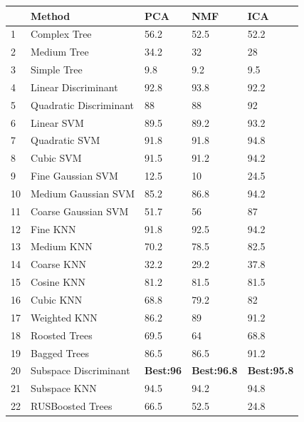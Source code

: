 \begin{center}
\begin{tabular}{|l|l|l|l|l|}
\hline
&Method&PCA&NMF&ICA\\\hline
1&Complex Tree &56.2&52.5&52.2\\\hline
2&Medium Tree & 34.2&32&28\\\hline
3&Simple Tree & 9.8&9.2&9.5\\\hline
4&Linear Discriminant & 92.8&93.8&92.2\\\hline
5&Quadratic Discriminant & 88&88&92\\\hline
6&Linear SVM& 89.5&89.2&93.2\\\hline
7&Quadratic SVM&91.8&91.8&94.8\\\hline
8&Cubic SVM& 91.5&91.2&94.2\\\hline
9&Fine Gaussian SVM&12.5&10&24.5\\\hline
10&Medium Gaussian SVM&85.2&86.8&94.2\\\hline
11&Coarse Gaussian SVM&51.7&56&87\\\hline
12&Fine KNN&91.8&92.5&94.2\\\hline
13&Medium KNN&70.2&78.5&82.5\\\hline
14&Coarse KNN&32.2&29.2&37.8\\\hline
15&Cosine KNN&81.2&81.5&81.5\\\hline
16&Cubic KNN&68.8&79.2&82\\\hline
17&Weighted KNN&86.2&89&91.2\\\hline
18&Roosted Trees&69.5&64&68.8\\\hline
19&Bagged Trees&86.5&86.5&91.2\\\hline
20&Subspace Discriminant&\textbf{Best:96}&\textbf{Best:96.8}&\textbf{Best:95.8}\\\hline
21&Subspace KNN&94.5&94.2&94.8\\\hline
22&RUSBoosted Trees&66.5&52.5&24.8\\\hline
\end{tabular}
\end{center}


